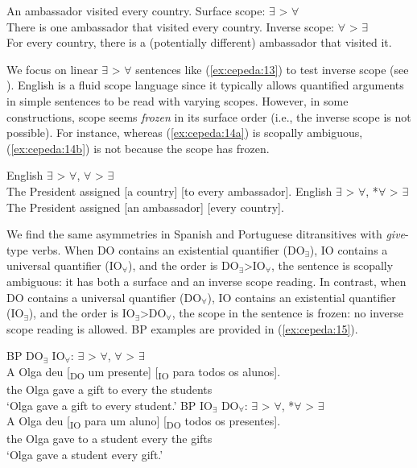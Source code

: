 \documentclass[output=paper,colorlinks,citecolor=brown,modfonts,nonflat]{langsci/langscibook}
\begin{document}
\ea%
    \label{ex:cepeda:13}
    An ambassador visited every country.
	\ea\label{ex:cepeda:13a}
	Surface scope: $\exists$ > $\forall$\\
	There is one ambassador that visited every country.
	\ex\label{ex:cepeda:13b} Inverse scope: $\forall$ > $\exists$\\
	For every country, there is a (potentially different) ambassador that visited it.
	\z
\z

We focus on linear $\exists$ > $\forall$ sentences like (\ref{ex:cepeda:13}) to test inverse scope (see \citealt{Larson2014}). English is a fluid scope language since it typically allows quantified arguments in simple sentences to be read with varying scopes. However, in some constructions, scope seems \textit{frozen} in its surface order (i.e., the inverse scope is not possible). For instance, whereas (\ref{ex:cepeda:14a}) is scopally ambiguous, (\ref{ex:cepeda:14b}) is not because the scope has frozen.

\ea%
    \label{ex:cepeda:14}
	\ea\label{ex:cepeda:14a}
	English $\exists$ > $\forall$, $\forall$ > $\exists$\\
	The President assigned [a country] [to every ambassador].
	\ex\label{ex:cepeda:14b}
	English $\exists$ > $\forall$, *$\forall$ > $\exists$\\
	The President assigned [an ambassador] [every country].
	\z
\z

We find the same asymmetries in Spanish and Portuguese ditransitives with \textit{give}-type verbs. When DO contains an existential quantifier (DO$_∃$), IO contains a universal quantifier (IO$_∀$), and the order is DO$_∃$>IO$_∀$, the sentence is scopally ambiguous: it has both a surface and an inverse scope reading. In contrast, when DO contains a universal quantifier (DO$_∀$), IO contains an existential quantifier (IO$_∃$), and the order is IO$_∃$>DO$_∀$, the scope in the sentence is frozen: no inverse scope reading is allowed. BP examples are provided in (\ref{ex:cepeda:15}).

\ea%
    \label{ex:cepeda:15}
	\ea\label{ex:cepeda:15a}
	BP DO$_∃$ IO$_∀$: $\exists$ > $\forall$, $\forall$ > $\exists$\\
	\gll A Olga deu [\textsubscript{DO} um presente] [\textsubscript{IO} para todos os  alunos].\\
		the Olga gave \hspaceThis{[\textsubscript{DO}} a    gift \hspaceThis{[\textsubscript{IO}} to    every the students\\
	\glt ‘Olga gave a gift to every student.’
	\ex\label{ex:cepeda:15b}
	BP IO$_∃$  DO$_∀$: $\exists$ > $\forall$, *$\forall$ > $\exists$\\
	\gll A Olga deu [\textsubscript{IO} para um aluno] [\textsubscript{DO} todos os presentes].\\
		the Olga gave \hspaceThis{[\textsubscript{IO}} to a student \hspaceThis{[\textsubscript{DO}} every the gifts\\
	\glt ‘Olga gave a student every gift.’
	\z
\z
\end{document}
